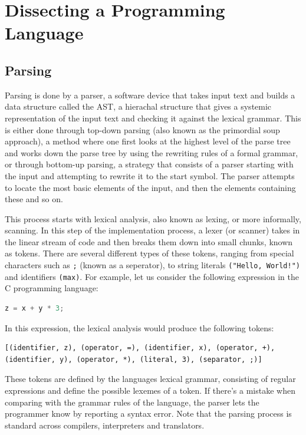 \section{Dissecting a Programming Language}

\subsection{Parsing}

Parsing is done by a parser, a software device that takes input text and builds a data structure called the \ac{AST}, a hierachal structure that gives a systemic representation of the input text and checking it against the lexical grammar. This is either done through top-down parsing (also known as the primordial soup approach), a method where one first looks at the highest level of the parse tree and works down the parse tree by using the rewriting rules of a formal grammar, or through bottom-up parsing, a strategy that consists of a parser starting with the input and attempting to rewrite it to the start symbol. The parser attempts to locate the most basic elements of the input, and then the elements containing these and so on. 

This process starts with lexical analysis, also known as lexing, or more informally, scanning. In this step of the implementation process, a lexer (or scanner) takes in the linear stream of code and then breaks them down into small chunks, known as tokens. There are several different types of these tokens, ranging from special characters such as \verb+;+ (known as a seperator), to string literals \verb+("Hello, World!")+ and identifiers \verb+(max)+. For example, let us consider the following expression in the C programming language:

\begin{lstlisting}[language=C++]
z = x + y * 3;\end{lstlisting}

In this expression, the lexical analysis would produce the following tokens:

\begin{lstlisting}
[(identifier, z), (operator, =), (identifier, x), (operator, +), (identifier, y), (operator, *), (literal, 3), (separator, ;)]
\end{lstlisting}

These tokens are defined by the languages lexical grammar, consisting of regular expressions and define the possible lexemes of a token. If there's a mistake when comparing with the grammar rules of the language, the parser lets the programmer know by reporting a syntax error. Note that the parsing process is standard across compilers, interpreters and translators.   

